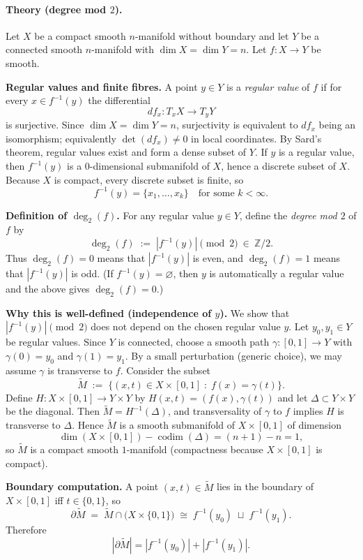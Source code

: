 \documentclass[12pt,a4paper]{article}
\DeclareMathOperator{\codim}{codim}
\theoremstyle{plain}
\theoremstyle{definition}      %
\begin{document}
\paragraph{Theory (degree mod $2$).}
Let $X$ be a compact smooth $n$-manifold without boundary and let $Y$ be a connected smooth $n$-manifold with $\dim X=\dim Y=n$.
Let $f:X\to Y$ be smooth.

\medskip
\noindent\textbf{Regular values and finite fibres.}
A point $y\in Y$ is a \emph{regular value} of $f$ if for every $x\in f^{-1}(y)$ the differential
\[
df_x:T_xX\longrightarrow T_yY
\]
is surjective. Since $\dim X=\dim Y=n$, surjectivity is equivalent to $df_x$ being an isomorphism; equivalently $\det(df_x)\neq 0$ in local coordinates.
By Sard's theorem, regular values exist and form a dense subset of $Y$.
If $y$ is a regular value, then $f^{-1}(y)$ is a $0$-dimensional submanifold of $X$, hence a discrete subset of $X$.
Because $X$ is compact, every discrete subset is finite, so
\[
f^{-1}(y)=\{x_1,\dots,x_k\}\quad\text{for some }k<\infty.
\]

\medskip
\noindent\textbf{Definition of $\deg_2(f)$.}
For any regular value $y\in Y$, define the \emph{degree mod $2$} of $f$ by
\[
\deg_2(f)\;:=\;|f^{-1}(y)|\pmod 2\ \in\ \mathbb Z/2.
\]
Thus $\deg_2(f)=0$ means that $|f^{-1}(y)|$ is even, and $\deg_2(f)=1$ means that $|f^{-1}(y)|$ is odd.
(If $f^{-1}(y)=\varnothing$, then $y$ is automatically a regular value and the above gives $\deg_2(f)=0$.)

\medskip
\noindent\textbf{Why this is well-defined (independence of $y$).}
We show that $|f^{-1}(y)|\pmod 2$ does not depend on the chosen regular value $y$.
Let $y_0,y_1\in Y$ be regular values. Since $Y$ is connected, choose a smooth path $\gamma:[0,1]\to Y$ with $\gamma(0)=y_0$ and $\gamma(1)=y_1$.
By a small perturbation (generic choice), we may assume $\gamma$ is transverse to $f$.
Consider the subset
\[
\widetilde M \;:=\;\{(x,t)\in X\times[0,1]\;:\; f(x)=\gamma(t)\}.
\]
Define $H:X\times[0,1]\to Y\times Y$ by $H(x,t)=(f(x),\gamma(t))$ and let $\Delta\subset Y\times Y$ be the diagonal.
Then $\widetilde M=H^{-1}(\Delta)$, and transversality of $\gamma$ to $f$ implies $H$ is transverse to $\Delta$.
Hence $\widetilde M$ is a smooth submanifold of $X\times[0,1]$ of dimension
\[
\dim(X\times[0,1])-\codim(\Delta)=(n+1)-n=1,
\]
so $\widetilde M$ is a compact smooth $1$-manifold (compactness because $X\times[0,1]$ is compact).

\medskip
\noindent\textbf{Boundary computation.}
A point $(x,t)\in \widetilde M$ lies in the boundary of $X\times[0,1]$ iff $t\in\{0,1\}$, so
\[
\partial \widetilde M \;=\;\widetilde M\cap \bigl(X\times\{0,1\}\bigr)
\;\cong\; f^{-1}(y_0)\;\sqcup\; f^{-1}(y_1).
\]
Therefore
\[
|\partial \widetilde M|=|f^{-1}(y_0)|+|f^{-1}(y_1)|.
\]
\end{document}
